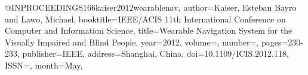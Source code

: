 @INPROCEEDINGS{166kaiser2012wearablenav,
author={Kaiser, Esteban Bayro and Lawo, Michael},
booktitle={IEEE/ACIS 11th International Conference on Computer and Information Science}, 
title={Wearable Navigation System for the Visually Impaired and Blind People}, 
year={2012},
volume={},
number={},
pages={230-233},
publisher={IEEE},
address={Shanghai, China},
doi={10.1109/ICIS.2012.118},
ISSN={},
month={May},}